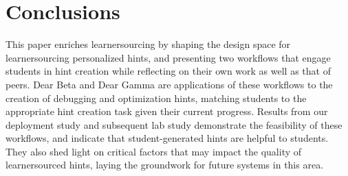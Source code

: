 
\section{Conclusions}
This paper enriches learnersourcing by shaping the design space for learnersourcing personalized hints, and presenting two workflows that engage students in hint creation while reflecting on their own work as well as that of peers. Dear Beta and Dear Gamma are applications of these workflows to the creation of debugging and optimization hints, matching students to the appropriate hint creation task given their current progress. Results from our deployment study and subsequent lab study demonstrate the feasibility of these workflows, and indicate that student-generated hints are helpful to students. They also shed light on critical factors that may impact the quality of learnersourced hints, laying the groundwork for future systems in this area.